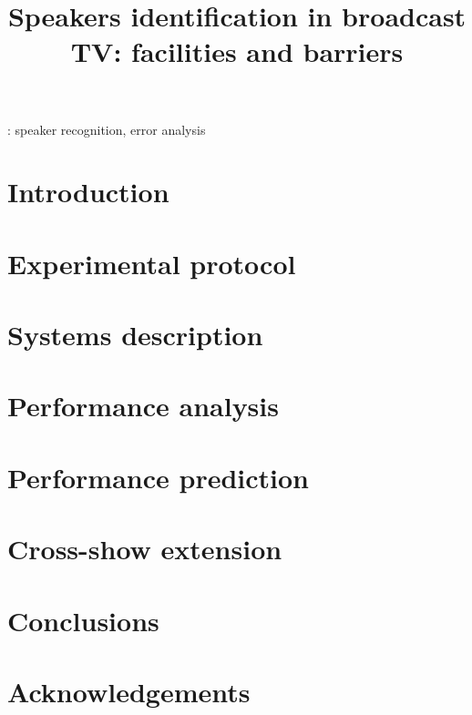 \documentclass[a4paper]{article}
\title{Speakers identification in broadcast TV: facilities and barriers}
\begin{document}
\maketitle

\begin{abstract}

\end{abstract}

: speaker recognition, error analysis


\section{Introduction}
\label{sec:introduction}


\section{Experimental protocol}
\label{sec:protocol}


\section{Systems description}
\label{sec:systems}


\section{Performance analysis}
\label{sec:analysis}


\section{Performance prediction}
\label{sec:prediction}


\section{Cross-show extension}
\label{sec:xshow}


\section{Conclusions}
\label{sec:conclusion}


\section{Acknowledgements}


\newpage
\eightpt



\end{document}
